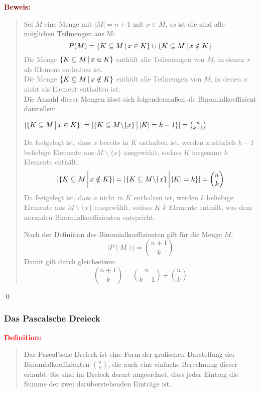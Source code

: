 \documentclass{article}
\newcommand{\smsp}{\phantom{\hspace{3px}}}
\newcommand{\red}[1]{\textcolor{red}{#1}}
\newcommand{\gray}[1]{\textcolor{gray}{#1}}
\newcommand{\maroon}[1]{\textcolor{maroon}{#1}}
\newcommand{\de}[1]{\red{\textbf{Definition: }}\begin{quote}#1\end{quote}}
\newcommand{\pr}[1]{\maroon{\textbf{Beweis: }}\begin{quote}#1\end{quote}\qed}
\newcommand{\vst}{\smsp \vline \smsp}
\begin{document}
\pr{
    Sei $M$ eine Menge mit $|M| = n + 1$ mit $x \in M$, so ist die sind alle möglichen Teilmengen aus M:
    \begin{equation*}
        P(M) = \{K \subseteq M \vst x \in K\} \cup \{K \subseteq M \vst x \notin K\}
    \end{equation*}
    \gray{Die Menge $\{K \subseteq M \vst x \in K\}$ enthält alle Teilemengen von $M$, in denen $x$ als Element enthalten ist.\\ Die Menge $\{K \subseteq M \vst x \notin K\}$ enthält alle Teilmengen von $M$, in denen $x$ nicht als Element enthalten ist.}\\
    Die Anzahl dieser Mengen lässt sich folgendermaßen als Binomialkoeffizient darstellen:
    \begin{center}
        $|\{K \subseteq M \vst x \in K\}| = |\{K \subseteq M \backslash \{x\} \vst |K| = k - 1\}| = \binom{n}{k - 1}$
    \end{center}
    \gray{Da festgelegt ist, dass $x$ bereits in $K$ enthalten ist, werden zusätzlich $k - 1$ beliebige Elemente aus $M \backslash \{x\}$ ausgewählt, sodass $K$ insgesamt $k$ Elemente enthält.}
    \begin{equation*}
        |\{K \subseteq M \vst x \notin K\}| = |\{K \subseteq M \backslash \{x\} \vst |K| = k\}| = \binom{n}{k}
    \end{equation*}
    \gray{Da festgelegt ist, dass $x$ nicht in $K$ enthalten ist, werden $k$ beliebige Elemente aus $M \backslash \{x\}$ ausgewählt, sodass $K$ $k$ Elemente enthält, was dem normalen Binomialkoeffizienten entspricht.}

    Nach der Definition des Binomialkoeffizienten gilt für die Menge $M$:
    \begin{equation*}
        |P(M)| = \binom{n + 1}{k} 
    \end{equation*}
    Damit gilt durch gleichsetzen:
    \begin{equation*}
        \binom{n + 1}{k} = \binom{n}{k - 1} + \binom{n}{k}
    \end{equation*}
}

\newpage

\subsubsection{Das Pascalsche Dreieck}

\de{Das Pascal'sche Dreieck ist eine Form der grafischen Darstellung der Binomialkoeffizienten $\binom{n}{k}$, die auch eine einfache Berechnung dieser erlaubt. Sie sind im Dreieck derart angeordnet, dass jeder Eintrag die Summe der zwei darüberstehenden Einträge ist.}
\end{document}
